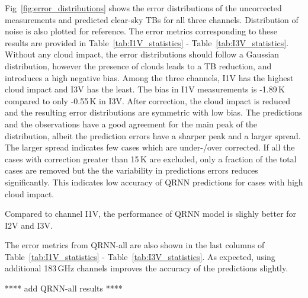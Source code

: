 \documentclass[amt, manuscript]{copernicus}
\begin{document}
Fig~\ref{fig:error_distributions} shows the error distributions of the uncorrected measurements and predicted clear-sky TBs for all three channels. Distribution of noise is also plotted for reference.  The error metrics corresponding to these results are provided in Table~\ref{tab:I1V_statistics} - Table~\ref{tab:I3V_statistics}. Without any cloud impact, the error distributions should follow a Gaussian distribution, however the presence of clouds leads to a TB reduction, and introduces a high negative bias. Among the three channels, I1V has the highest cloud impact and I3V has the least. The bias in I1V measurements is -1.89\,K compared to only -0.55\,K in I3V. After correction, the cloud impact is reduced and the resulting error distributions are symmetric with low bias. The predictions and the observations have a good agreement for the main peak of the distribution, albeit the prediction errors have a sharper peak and a larger spread. The larger spread indicates few cases which are under-/over corrected. If all the cases with correction greater than 15\,K are excluded, only a fraction of the total cases are removed but the  the variability in predictions errors reduces significantly. This indicates low accuracy of QRNN predictions for cases with high cloud impact.

Compared to channel I1V, the performance of QRNN model is slighly better for I2V and I3V.   

The error metrics from QRNN-all are also shown in the last columns of Table~\ref{tab:I1V_statistics} - Table~\ref{tab:I3V_statistics}. As expected, using additional 183\,GHz channels improves the accuracy of the predictions slightly.  

**** add QRNN-all results ****
\end{document}
